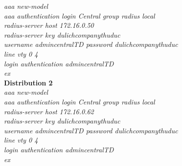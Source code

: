 \documentclass[a4paper, 12pt]{article}
\begin{document}
\hspace*{2cm}\textit{aaa new-model\\
\hspace*{2cm}aaa authentication login Central group radius local\\
\hspace*{2cm}radius-server host 172.16.0.50\\
\hspace*{2cm}radius-server key dulichcompanythuduc\\
\hspace*{2cm}username admincentralTD password dulichcompanythuduc\\
\hspace*{2cm}line vty 0 4\\
\hspace*{2cm}login authentication admincentralTD\\
\hspace*{2cm}ex\\}
\hspace*{1cm} \textbf{Distribution 2}\\
\hspace*{2cm}\textit{aaa new-model\\
\hspace*{2cm}aaa authentication login Central group radius local\\
\hspace*{2cm}radius-server host 172.16.0.62\\
\hspace*{2cm}radius-server key dulichcompanythuduc\\
\hspace*{2cm}username admincentralTD password dulichcompanythuduc\\
\hspace*{2cm}line vty 0 4\\
\hspace*{2cm}login authentication admincentralTD\\
\hspace*{2cm}ex\\}
\end{document}
